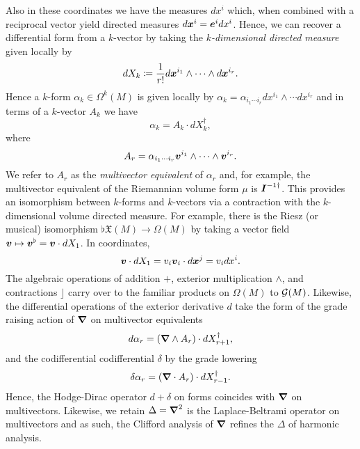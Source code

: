\documentclass[conf]{new-aiaa}
\begin{document}
Also in these coordinates we have the measures $dx^i$ which, when combined with a reciprocal vector yield directed measures $d\boldsymbol{x}^i = \boldsymbol{e}^i dx^i$. Hence, we can recover a differential form from a $k$-vector by taking the \emph{$k$-dimensional directed measure} given locally by 
\begin{equation}
    dX_k \coloneqq \frac{1}{r!} d\boldsymbol{x}^{i_1}\wedge \cdots \wedge d\boldsymbol{x}^{i_r}.
\end{equation}
Hence a $k$-form $\alpha_k \in \Omega^k(M)$ is given locally by  $\alpha_k = \alpha_{i_1 \cdots i_r} dx^{i_1}\wedge \cdots dx^{i_r}$ and in terms of a $k$-vector $A_k$ we have
\begin{equation}
\alpha_k = A_k \cdot dX_k^\dagger,
\end{equation}
where
\begin{equation}
A_r = \alpha_{i_1 \cdots i_r} \boldsymbol{v}^{i_1} \wedge \cdots \wedge \boldsymbol{v}^{i_r}.
\end{equation}
We refer to $A_r$ as the \emph{multivector equivalent} of $\alpha_r$ and, for example, the multivector equivalent of the Riemannian volume form $\mu$ is $\boldsymbol{I}^{-1 \dagger}$. This provides an isomorphism between $k$-forms and $k$-vectors via a contraction with the $k$-dimensional volume directed measure. For example, there is the Riesz (or musical) isomorphism $\flat \mathfrak{X}(M)\to \Omega(M)$ by taking a vector field $\boldsymbol{v} \mapsto \boldsymbol{v}^\flat = \boldsymbol{v} \cdot dX_1$. In coordinates,
\begin{equation}
\label{eq:line_element}
 \boldsymbol{v} \cdot dX_1 = v_i  \boldsymbol{v}_i \cdot d\boldsymbol{x}^j = v_i dx^i.
\end{equation}
The algebraic operations of addition $+$, exterior multiplication $\wedge$, and contractions $\rfloor$ carry over to the familiar products on $\Omega(M)$ to $\mathcal{G}(M)$. Likewise, the differential operations of the exterior derivative $d$ take the form of the grade raising action of $\boldsymbol{\nabla}$ on multivector equivalents
\begin{equation}
d \alpha_r = (\boldsymbol{\nabla} \wedge A_r) \cdot dX_{r+1}^\dagger,
\end{equation}
and the codifferential  codifferential $\delta$ by the grade lowering
\begin{equation}
\delta \alpha_r = (\boldsymbol{\nabla} \cdot A_r)\cdot dX_{r-1}^\dagger.
\end{equation} 
Hence, the Hodge-Dirac operator $d+\delta$ on forms coincides with $\boldsymbol{\nabla}$ on multivectors. Likewise, we retain $\Delta = \boldsymbol{\nabla}^2$ is the Laplace-Beltrami operator on multivectors and as such, the Clifford analysis of $\boldsymbol{\nabla}$ refines the $\Delta$ of harmonic analysis.
\end{document}
